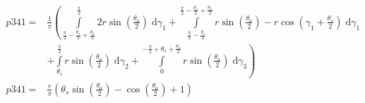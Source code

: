 \begin{align}
    p341 =&\frac{1}{\pi} \left(\int\limits_{\frac{\pi}{2} - \frac{\theta_{s}}{2} + \frac{\theta_{a}}{2}}^{\frac{\pi}{2}}2 r \sin{\left (\frac{\theta_{a}}{2} \right )}\;\mathrm{d}\gamma_{1}+\int\limits_{\frac{\pi}{2} - \frac{\theta_{s}}{2}}^{\frac{\pi}{2} - \frac{\theta_{s}}{2} + \frac{\theta_{a}}{2}}r \sin{\left (\frac{\theta_{a}}{2} \right )} - r \cos{\left (\gamma_{1} + \frac{\theta_{s}}{2} \right )}\;\mathrm{d}\gamma_{1}\right.\\
 &\left.+\int\limits_{\theta_{s}}^{\frac{\pi}{2}}r \sin{\left (\frac{\theta_{a}}{2} \right )}\;\mathrm{d}\gamma_{2}+\int\limits_{0}^{- \frac{\pi}{2} + \theta_{s} + \frac{\theta_{a}}{2}}r \sin{\left (\frac{\theta_{a}}{2} \right )}\;\mathrm{d}\gamma_{3}\right)\\
    p341 =& \frac{r}{\pi} \left(\theta_{s} \sin{\left (\frac{\theta_{a}}{2} \right )} - \cos{\left (\frac{\theta_{a}}{2} \right )} + 1\right)
\end{align}